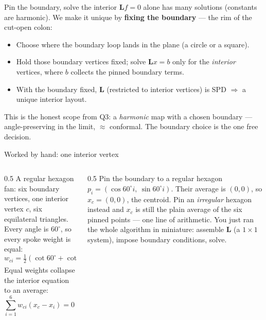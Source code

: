 \documentclass[aspectratio=169,10pt]{beamer}
\newcommand{\half}{\tfrac{1}{2}}
\newcommand{\Lmat}{\mathbf{L}}
\begin{document}
\begin{frame}{Pin the boundary, solve the interior}
  $\Lmat f=0$ alone has many solutions (constants are harmonic). We make it unique by \textbf{fixing the boundary} --- the rim of the cut-open colon:
  \begin{itemize}
    \item Choose where the boundary loop lands in the plane (a circle or a square).
    \item Hold those boundary vertices fixed; solve $\Lmat x=b$ only for the \emph{interior} vertices, where $b$ collects the pinned boundary terms.
    \item With the boundary fixed, $\Lmat$ (restricted to interior vertices) is SPD $\Rightarrow$ a unique interior layout.
  \end{itemize}
  This is the honest scope from Q3: a \emph{harmonic} map with a chosen boundary --- angle-preserving in the limit, $\approx$ conformal. The boundary choice is the one free decision.
\end{frame}

\begin{frame}{Worked by hand: one interior vertex}
  \begin{columns}[T]
    \begin{column}{0.5\textwidth}
      A regular hexagon fan: six boundary vertices, one interior vertex $c$, six equilateral triangles. Every angle is $60^\circ$, so every spoke weight is equal:
      \[
        w_{ci}=\half(\cot 60^\circ+\cot 60^\circ)=\tfrac{1}{\sqrt3}.
      \]
      Equal weights collapse the interior equation to an average:
      \[
        \sum_{i=1}^{6} w_{ci}(x_c-x_i)=0\ \Rightarrow\ x_c=\tfrac{1}{6}\textstyle\sum_i x_i .
      \]
    \end{column}
    \begin{column}{0.5\textwidth}
      Pin the boundary to a regular hexagon $p_i=(\cos 60^\circ i,\ \sin 60^\circ i)$. Their average is $(0,0)$, so $x_c=(0,0)$, the centroid. Pin an \emph{irregular} hexagon instead and $x_c$ is still the plain average of the six pinned points --- one line of arithmetic.
      \smallskip
      You just ran the whole algorithm in miniature: assemble $\Lmat$ (a $1\times1$ system), impose boundary conditions, solve.
    \end{column}
  \end{columns}
\end{frame}
\end{document}
